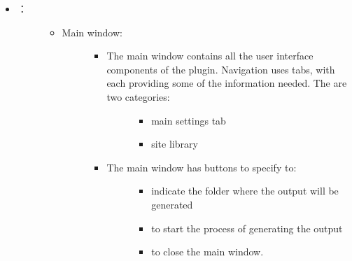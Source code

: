 \documentclass[letterpaper,10pt,english]{sphinxmanual}
\begin{document}
\begin{itemize}
\item {} \begin{description}
\item[{：}] \leavevmode\begin{itemize}
\item {} \begin{description}
\item[{Main window:}] \leavevmode\begin{itemize}
\item {} \begin{description}
\item[{The main window contains all the user interface components of the plugin. Navigation uses tabs, with each providing some of the information needed. The are two categories:}] \leavevmode\begin{itemize}
\item {} 
main settings tab

\item {} 
site library

\end{itemize}

\end{description}

\item {} \begin{description}
\item[{The main window has buttons to specify to:}] \leavevmode\begin{itemize}
\item {} 
indicate the folder where the output will be generated

\item {} 
to start the process of generating the output

\item {} 
to close the main window.

%
\begin{sphinxVerbatim}[commandchars=\\\{\}]
          
         
\end{sphinxVerbatim}


\end{itemize}
\end{description}
\end{itemize}
\end{description}
\end{itemize}
\end{description}
\end{itemize}
\end{document}
